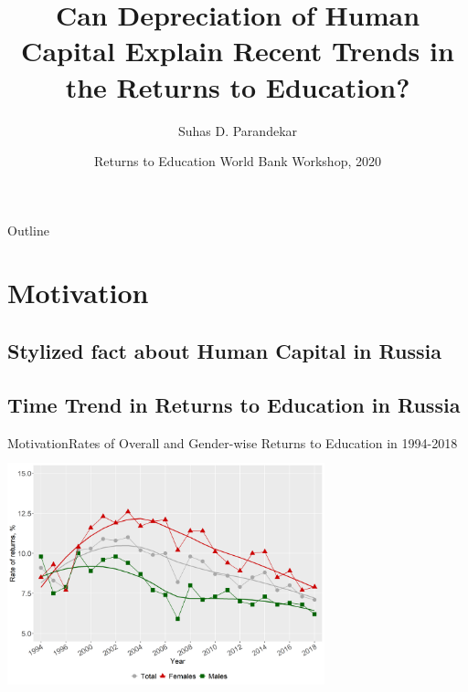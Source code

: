 \documentclass{beamer}
\title[Depreciation and Returns to Education] 
{Can Depreciation of Human Capital Explain Recent Trends in the Returns to Education?}
\author{Suhas D. Parandekar}
\date[WB Workshop, 2020]{Returns to Education World Bank Workshop, 2020}
\begin{document}
	
\begin{frame}
	\titlepage
\end{frame}

\begin{frame}{Outline}
	\tableofcontents
\end{frame}
	
\section{Motivation}

\subsection{Stylized fact about Human Capital in Russia}
\subsection{Time Trend in Returns to Education in Russia}

\begin{frame}{Motivation}{Rates of Overall and Gender-wise Returns to Education in 1994-2018}
	\centering
	\includegraphics[width=260pt, height=200pt]{re_edu.png}
\end{frame}
\end{document}
